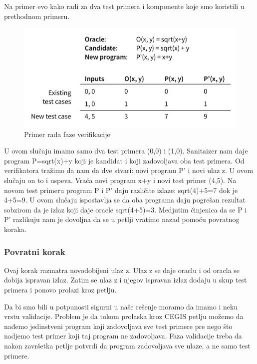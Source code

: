 Na primer evo kako radi za dva test primera i komponente koje smo koristili u prethodnom primeru.

\begin{figure}[h!]
\begin{center}
\includegraphics[scale=0.6]{resources/oracle-table.png}
\end{center}
\caption{Primer rada faze verifikacije}
\label{fig:oraclePrimer1}
\end{figure}


U ovom slučaju imamo samo dva test primera (0,0) i (1,0). Sanitaizer nam daje program P=sqrt(x)+y koji je kandidat i koji zadovoljava oba test primera. Od verifikatora tražimo da nam da dve stvari: novi program P' i novi ulaz z. U ovom slučaju on to i uspeva. Vraća novi program x+y i novi test primer (4,5). Na novom test primeru program P i P' daju različite izlaze: sqrt(4)+5=7 dok je 4+5=9. U ovom slučaju ispostavlja se da oba programa daju pogrešan rezultat sobzirom da je izlaz koji daje oracle sqrt(4+5)=3. Medjutim činjenica da se P i P' razlikuju nam je dovoljna da se u petlji vratimo nazad pomoću povratnog koraka.

\subsubsection*{Povratni korak}


Ovaj korak razmatra novodobijeni ulaz z. Ulaz z se daje oraclu i od oracla se dobija ispravan izlaz. Zatim se ulaz z i njegov ispravan izlaz dodaju u skup test primera i ponovo prolazi kroz petlju.

Da bi smo bili u potpunosti sigurni u naše rešenje moramo da imamo i neku vrstu validacije. Problem je da tokom prolaska kroz CEGIS petlju možemo da nađemo jedinstveni program koji zadovoljava sve test primere pre nego što nadjemo test primer koji taj program ne zadovoljava. Faza validacije treba da nakon završetka petlje potvrdi da program zadovoljava sve ulaze, a ne samo test primere.

